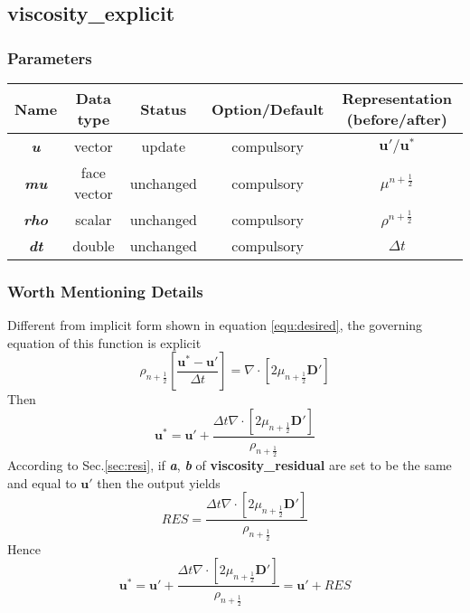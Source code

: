 \documentclass[a4paper]{article}
\newcommand{\func}[1]{\textbf{\textcolor{function}{#1}}}
\newcommand{\para}[1]{\textbf{\emph{\textcolor{para}{#1}}}}
\begin{document}
\subsection{\func{viscosity\_explicit}}
\subsubsection{Parameters}
\begin{center}
  \begin{tabular}{|c|c|c|c|c|}
    \hline
    Name & Data type & Status & Option/Default & Representation (before/after)\\[0.5ex]
    \hline\hline
    \rowcolor{output}\para{u} & vector & update & compulsory & $ \mathbf{u}'/ \mathbf{u}^*$\\
    \hline
    \para{mu} & face vector & unchanged & compulsory & $ \mu^{n+ \frac{1}{2}}$\\
    \hline
    \para{rho} & scalar & unchanged & compulsory & $\rho^{n+ \frac{1}{2}}$\\
    \hline
    \para{dt} & double & unchanged & compulsory & $\Delta t$ \\
    \hline
  \end{tabular}
\end{center}

\subsubsection{Worth Mentioning Details}
Different from implicit form shown in equation \ref{equ:desired}, the governing equation of this function is explicit
\begin{equation}
  \rho_{n+ \frac{1}{2}}[ \frac{ \mathbf{u}^*- \mathbf{u}'}{\Delta t}] = \nabla\cdot [2\mu_{n+ \frac{1}{2}} \mathbf{D}']
\end{equation}
Then
\begin{equation}
  \mathbf{u}^* = \mathbf{u}' + \frac{\Delta t\nabla\cdot[2 \mu_{n+ \frac{1}{2}} \mathbf{D}']}{\rho_{n + \frac{1}{2}}} 
\end{equation}
According to Sec.\ref{sec:resi}, 
if \para{a}, \para{b} of \func{viscosity\_residual} are set to be the same and equal to $ \mathbf{u}'$ then the output yields
\begin{equation}
  RES = \frac{\Delta t\nabla\cdot[2 \mu_{n+ \frac{1}{2}} \mathbf{D}']}{\rho_{n + \frac{1}{2}}}
\end{equation}
Hence
\begin{equation}
  \mathbf{u}^* = \mathbf{u}' + \frac{\Delta t\nabla\cdot[2 \mu_{n+ \frac{1}{2}} \mathbf{D}']}{\rho_{n + \frac{1}{2}}}= \mathbf{u}'+ RES 
\end{equation}
\end{document}
